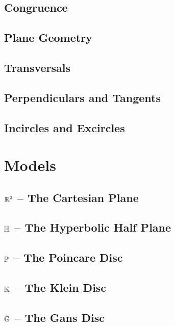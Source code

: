 \documentclass{memoir}
\begin{document}
  \section{Congruence}
    
    \newpage

  \section{Plane Geometry}
    
    \newpage

  \section{Transversals}
    
    \newpage

  \section{Perpendiculars and Tangents}
    
    \newpage

  \section{Incircles and Excircles}
    


\chapter{Models}
\newpage

  \section{\(\mathbb{R}^2\) -- The Cartesian Plane}
    
    \newpage

  \section{\(\mathbb{H}\) -- The Hyperbolic Half Plane}
    
    \newpage

  \section{\(\mathbb{P}\) -- The Poincare Disc}
    
    \newpage

  \section{\(\mathbb{K}\) -- The Klein Disc}
    
    \newpage

  \section{\(\mathbb{G}\) -- The Gans Disc}
    


\backmatter
  
  

  \printindex
\end{document}
